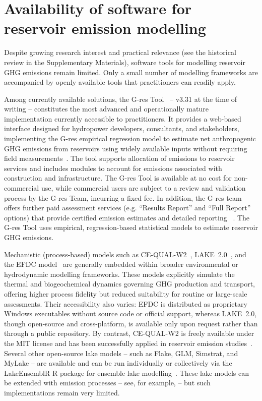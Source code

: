 \documentclass[review, authoryear, 1p]{elsarticle} %
\begin{document}
\section{Availability of software for reservoir emission modelling}
\label{subsec:software_and_code}

Despite growing research interest and practical relevance (see the historical review in the Supplementary Materials), software tools for modelling reservoir \ac{GHG} emissions remain limited.
Only a small number of modelling frameworks are accompanied by openly available tools that practitioners can readily apply.

Among currently available solutions, the G-res Tool~\citep{Prairie2017b,prairie2017gres} -- v3.31 at the time of writing -- constitutes the most advanced and operationally mature implementation currently accessible to practitioners.
It provides a web-based interface designed for hydropower developers, consultants, and stakeholders, implementing the G-res empirical regression model to estimate net anthropogenic \ac{GHG} emissions from reservoirs using widely available inputs without requiring field measurements~\citep{Prairie2021}. 
The tool supports allocation of emissions to reservoir services and includes modules to account for emissions associated with construction and infrastructure.
The G-res Tool is available at no cost for non-commercial use, while commercial users are subject to a review and validation process by the G-res Team, incurring a fixed fee.
In addition, the G-res team offers further paid assessment services (e.g. ``Results Report'' and ``Full Report'' options) that provide certified emission estimates and detailed reporting ~\citep{prairie2017gres}.
The G-res Tool uses empirical, regression-based statistical models to estimate reservoir \ac{GHG} emissions.

Mechanistic (process-based) models such as CE-QUAL-W2~\citep{Berger2014}, LAKE~2.0~\citep{Lomov2024, Stepanenko2016}, and the \ac{EFDC} model~\citep{hamrick1992, SHI2025} are generally embedded within broader environmental or hydrodynamic modelling frameworks.
These models explicitly simulate the thermal and biogeochemical dynamics governing \ac{GHG} production and transport, offering higher process fidelity but reduced suitability for routine or large-scale assessments.
Their accessibility also varies: \ac{EFDC} is distributed as proprietary Windows executables without source code or official support, whereas LAKE~2.0, though open-source and cross-platform, is available only upon request rather than through a public repository.
By contrast, CE-QUAL-W2 is freely available under the MIT license and has been successfully applied in reservoir emission studies~\citep{Berger2014, Wu2022}.
Several other open-source lake models -- such as Flake, GLM, Simstrat, and MyLake -- are available and can be run individually or collectively via the LakeEnsemblR R package for ensemble lake modelling~\citep{Moore2021}.
These lake models can be extended with emission processes -- see, for example, \citep{Soued2020exp} -- but such implementations remain very limited.
\end{document}

